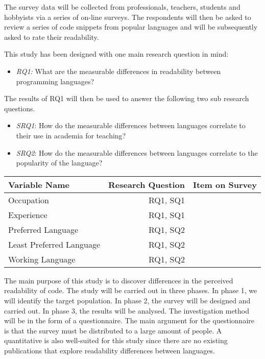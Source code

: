 \documentclass[times, 10pt,twocolumn]{IEEEtran}
\begin{document}
The survey data will be collected from professionals, teachers, students and hobbyists via a series of on-line surveys. The respondents will then be asked to review a series of code snippets from popular languages and will be subsequently asked to rate their readability. 
\newline

This study has been designed with one main research question in mind:
\begin{itemize}
\item \textit{RQ1:} What are the measurable differences in readability between programming languages?
\end{itemize}


The results of RQ1 will then be used to answer the following two sub research questions. 
\begin{itemize}
\item \textit{SRQ1}: How do the measurable differences between languages correlate to their use in academia for teaching?
\item \textit{SRQ2}: How do the measurable differences between languages correlate to the popularity of the language?
\end{itemize}

\begin{tabular}{| l | r | c |}
	\hline
	\textbf{Variable Name} & \textbf{Research Question} & \textbf{Item on Survey} \\ \hline
	Occupation & RQ1, SQ1 & \\ \hline
	Experience & RQ1, SQ1 & \\ \hline
	Preferred Language & RQ1, SQ2 & \\ \hline
	Least Preferred Language & RQ1, SQ2& \\  \hline
	Working Language & RQ1, SQ2 & \\ 
	\hline
	\end{tabular}
The main purpose of this study is to discover differences in the perceived readability of code. The study will be carried out in three phases. In phase 1, we will identify the target population. In phase 2, the survey will be designed and carried out. In phase 3, the results will be analysed. The investigation method will be in the form of a questionnaire. The main argument for the questionnaire is that the survey must be distributed to a large amount of people. A quantitative is also well-suited for this study since there are no existing publications that explore readability differences between languages. 
\end{document}
